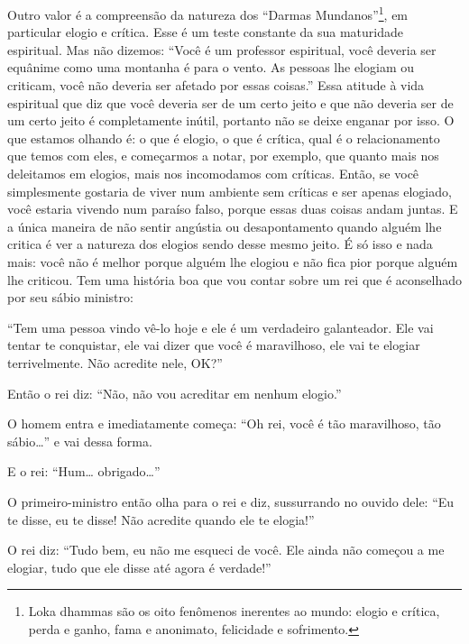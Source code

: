 Outro valor é a compreensão da natureza dos “Darmas
Mundanos”\footnote{Loka dhammas são os oito fenômenos inerentes ao
mundo: elogio e crítica, perda e ganho, fama e anonimato, felicidade e
sofrimento.}, em particular elogio e crítica. Esse é um teste constante
da sua maturidade espiritual. Mas não dizemos: “Você é um professor
espiritual, você deveria ser equânime como uma montanha é para o vento.
As pessoas lhe elogiam ou criticam, você não deveria ser afetado por
essas coisas.” Essa atitude à vida espiritual que diz que você deveria
ser de um certo jeito e que não deveria ser de um certo jeito é
completamente inútil, portanto não se deixe enganar por isso. O que
estamos olhando é: o que é elogio, o que é crítica, qual é o
relacionamento que temos com eles, e começarmos a notar, por exemplo,
que quanto mais nos deleitamos em elogios, mais nos incomodamos com
críticas. Então, se você simplesmente gostaria de viver num ambiente
sem críticas e ser apenas elogiado, você estaria vivendo num paraíso
falso, porque essas duas coisas andam juntas. E a única maneira de não
sentir angústia ou desapontamento quando alguém lhe critica é ver a
natureza dos elogios sendo desse mesmo jeito. É só isso e nada mais:
você não é melhor porque alguém lhe elogiou e não fica pior porque
alguém lhe criticou. Tem uma história boa que vou contar sobre um rei
que é aconselhado por seu sábio ministro: 

“Tem uma pessoa vindo vê-lo hoje e ele é um verdadeiro galanteador.
Ele vai tentar te conquistar, ele vai dizer que você é maravilhoso, ele
vai te elogiar terrivelmente. Não acredite nele, OK?” 

Então o rei diz: “Não, não vou acreditar em nenhum elogio.” 

O homem entra e imediatamente começa: “Oh rei, você é tão
maravilhoso, tão sábio…” e vai dessa forma.

E o rei: “Hum… obrigado…”

O primeiro-ministro então olha para o rei e diz, sussurrando no
ouvido dele: “Eu te disse, eu te disse! Não acredite quando ele te
elogia!” 

O rei diz: “Tudo bem, eu não me esqueci de você. Ele ainda não
começou a me elogiar, tudo que ele disse até agora é verdade!” 

